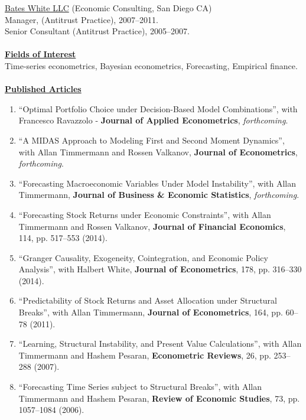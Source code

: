 \documentclass[12pt]{article}
\begin{document}
\underline{Bates White LLC} (Economic Consulting, San Diego CA)\\
Manager, (Antitrust Practice), 2007--2011.\\
Senior Consultant (Antitrust Practice), 2005--2007. \\ \\
\underline{\textbf{Fields of Interest}}\\
Time-series econometrics, Bayesian econometrics, Forecasting, Empirical finance.\\ \\
\underline{\textbf{Published Articles}}
\begin{enumerate}	

	\item ``Optimal Portfolio Choice under Decision-Based Model Combinations'', with Francesco Ravazzolo - \textbf{Journal of Applied Econometrics}, \textit{forthcoming}.
	\item ``A MIDAS Approach to Modeling First and Second Moment Dynamics'', with Allan Timmermann and Rossen Valkanov, \textbf{Journal of Econometrics}, \textit{forthcoming}.
  \item ``Forecasting Macroeconomic Variables Under Model Instability'', with Allan Timmermann, \textbf{Journal of Business \& Economic Statistics},  \textit{forthcoming}. 
	\item ``Forecasting Stock Returns under Economic Constraints'', with Allan Timmermann and Rossen Valkanov, \textbf{Journal of Financial Economics}, 114, pp. 517--553 (2014). 
	\item ``Granger Causality, Exogeneity, Cointegration, and Economic Policy Analysis'', with Halbert White, \textbf{Journal of Econometrics}, 178, pp. 316--330 (2014). 
	\item ``Predictability of Stock Returns and Asset Allocation under Structural Breaks'', with Allan Timmermann, \textbf{Journal of Econometrics}, 164, pp. 60--78 (2011). 
	\item ``Learning, Structural Instability, and Present Value Calculations'', with Allan Timmermann and Hashem Pesaran, \textbf{Econometric Reviews}, 26, pp. 253--288 (2007). 
	\item ``Forecasting Time Series subject to Structural Breaks'', with Allan Timmermann and Hashem Pesaran, \textbf{Review of Economic Studies}, 73, pp. 1057--1084 (2006). 

    \setcounter{enumTemp}{\theenumi}
 \end{enumerate}
\end{document}
